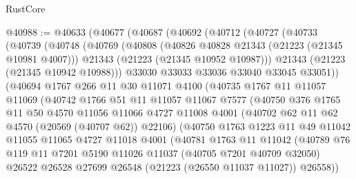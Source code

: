 \begin{lexlean}{RustCore}
\begin{coremodule}
@40988 := @40633
    (@40677
      (@40687
        (@40692
          (@40712
            (@40727
              (@40733
                (@40739
                  (@40748
                    (@40769
                      (@40808
                        (@40826 @40828 @21343 (@21223 (@21345 @10981 @4007)))
                        @21343
                        (@21223 (@21345 @10952 @10987)))
                      @21343
                      (@21223 (@21345 @10942 @10988)))
                    @33030
                    @33033
                    @33036
                    @33040
                    @33045
                    @33051))
                (@40694
                  @1767
                  @266
                  @11
                  @30
                  @11071
                  @4100
                  (@40735
                    @1767
                    @11
                    @11057
                    @11069
                    (@40742
                      @1766
                      @51
                      @11
                      @11057
                      @11067
                      @7577
                      (@40750
                        @376
                        @1765
                        @11
                        @50
                        @4570
                        @11056
                        @11066
                        @4727
                        @11008
                        @4001
                        (@40702 @62 @11 @62 @4570 (@20569 (@40707 @62)) @22106)
                        (@40750
                          @1763
                          @1223
                          @11
                          @49
                          @11042
                          @11055
                          @11065
                          @4727
                          @11018
                          @4001
                          (@40781
                            @1763
                            @11
                            @11042
                            (@40789
                              @76
                              @119
                              @11
                              @7201
                              @5190
                              @11026
                              @11037
                              (@40705 @7201 @40709 @32050)
                              @26522
                              @26528
                              @27699
                              @26548
                              (@21223 (@26550 @11037 @11027))
                              @26558))

\end{coremodule}
\end{lexlean}

